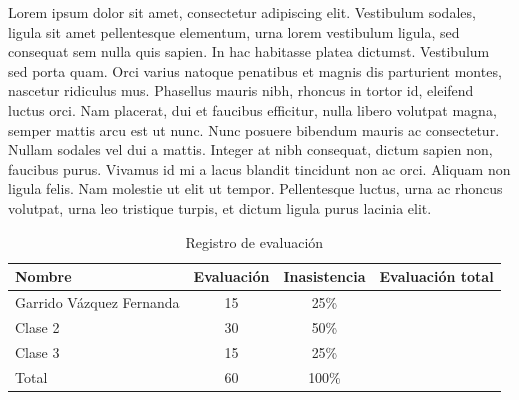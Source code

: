 \documentclass[letterpaper, 12pt]{article}
\begin{document}
\FloatBarrier  %
Lorem ipsum dolor sit amet, consectetur adipiscing elit. Vestibulum sodales, ligula sit amet pellentesque 
elementum, urna lorem vestibulum ligula, sed consequat sem nulla quis sapien. In hac habitasse platea dictumst. 
Vestibulum sed porta quam. Orci varius natoque penatibus et magnis dis parturient montes, nascetur ridiculus mus. 
Phasellus mauris nibh, rhoncus in tortor id, eleifend luctus orci. Nam placerat, dui et faucibus efficitur, 
nulla libero volutpat magna, semper mattis arcu est ut nunc. Nunc posuere bibendum mauris ac consectetur. 
Nullam sodales vel dui a mattis. Integer at nibh consequat, dictum sapien non, faucibus purus. Vivamus id mi a 
lacus blandit tincidunt non ac orci. Aliquam non ligula felis. Nam molestie ut elit ut tempor. Pellentesque 
luctus, urna ac rhoncus volutpat, urna leo tristique turpis, et dictum ligula purus lacinia elit.


\begin{table}[h]
                \centering
                \caption{Registro de evaluación}
                \renewcommand{\arraystretch}{1.5} %
                \begin{tabular}{|l|c|c|r|} %
                    \hline %
                    Nombre & Evaluación & Inasistencia & Evaluación total\\ \hline \hline
                    Garrido Vázquez Fernanda          & 15                 & 25\%            &\\ \hline
                    Clase 2          & 30                 & 50\%            &\\ \hline
                    Clase 3          & 15                 & 25\%            &\\ \hline
                    Total            & 60                 & 100\%           &\\ \hline
                \end{tabular}
\end{table} \vspace{0.8cm}
\end{document}
